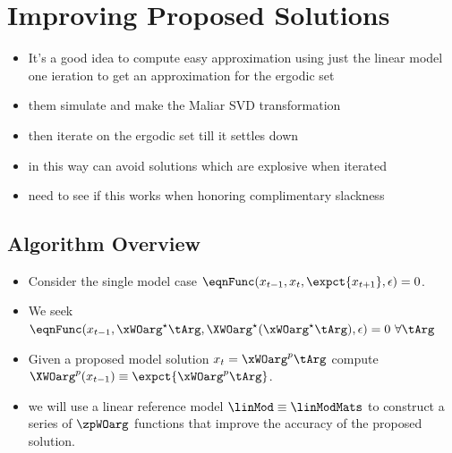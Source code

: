 \documentclass[12pt]{article}
\begin{document}
\section{Improving Proposed  Solutions}
\label{sec:algoforsoln}

\begin{itemize}
\item It's a good idea to compute easy approximation using just the linear model one ieration to get an approximation for the ergodic set
\item them simulate and make the Maliar SVD transformation
\item then iterate on the ergodic set till it settles down
\item in this way can avoid solutions which are explosive when iterated 
\item need to see if this works when honoring complimentary slackness
\end{itemize}


\subsection{Algorithm Overview}
\label{sec:pseudocode}
{
  \begin{itemize}
  \item Consider the single model case $  \eqnFunc(x_{t-1},x_t,\expct{x_{t+1}},\epsilon)=0$.  
\item We seek $\eqnFunc(x_{t-1},\xWOarg^\star\tArg,\XWOarg^\star(\xWOarg^\star\tArg),\epsilon)=0\,\,\forall \tArg $
\item Given a proposed model solution $x_t=\xWOarg^p\tArg$ compute $\XWOarg^p(x_{t-1})\equiv \expct{\xWOarg^p\tArg}$. 
\item we will use a linear reference model $\linMod  \equiv \linModMats$ 
to construct a series of $\zpWOarg$ functions that improve the accuracy of the proposed solution.
\end{itemize}
}
\end{document}
